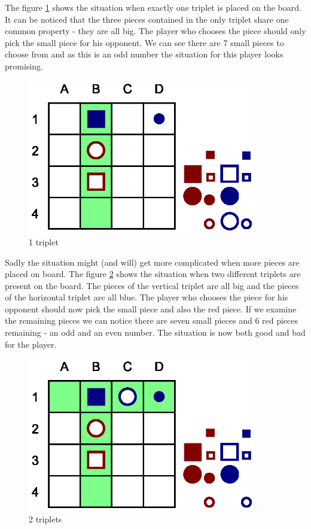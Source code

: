 \documentclass[paper=a4, fontsize=11pt]{article} %
\begin{document}
The figure \ref{fig:1triplet} shows the situation when exactly one triplet is placed on the board. It can be noticed that the three pieces contained in the only triplet share one common property - they are all big. The player who chooses the piece should only pick the small piece for his opponent. We can see there are 7 small pieces to choose from and as this is an odd number the situation for this player looks promising.

\begin{figure}[!htb]
	\centering
		\includegraphics[width=10cm]{img/eval_func_1triplet.eps}
	\caption{1 triplet}
	\label{fig:1triplet}
\end{figure}

Sadly the situation might (and will) get more complicated when more pieces are placed on board. The figure \ref{fig:2triplets} shows the situation when two different triplets are present on the board. The pieces of the vertical triplet are all big and the pieces of the horizontal triplet are all blue. The player who chooses the piece for his opponent should now pick the small piece and also the red piece. If we examine the remaining pieces we can notice there are seven small pieces and 6 red pieces remaining - an odd and an even number. The situation is now both good and bad for the player.

\begin{figure}[!htb]
	\centering
		\includegraphics[width=10cm]{img/eval_func_2triplets.eps}
	\caption{2 triplets}
	\label{fig:2triplets}
\end{figure}
\end{document}
